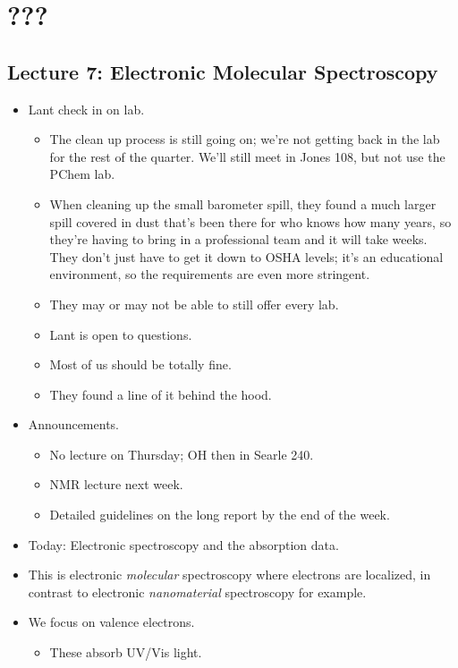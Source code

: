 \documentclass[../notes.tex]{subfiles}
\begin{document}
\chapter{???}
\section{Lecture 7: Electronic Molecular Spectroscopy}
\begin{itemize}
    \item {}Lant check in on lab.
    \begin{itemize}
        \item The clean up process is still going on; we're not getting back in the lab for the rest of the quarter. We'll still meet in Jones 108, but not use the PChem lab.
        \item When cleaning up the small barometer spill, they found a much larger spill covered in dust that's been there for who knows how many years, so they're having to bring in a professional team and it will take weeks. They don't just have to get it down to OSHA levels; it's an educational environment, so the requirements are even more stringent.
        \item They may or may not be able to still offer every lab.
        \item Lant is open to questions.
        \item Most of us should be totally fine.
        \item They found a line of it behind the hood.
    \end{itemize}
    \item Announcements.
    \begin{itemize}
        \item No lecture on Thursday; OH then in Searle 240.
        \item NMR lecture next week.
        \item Detailed guidelines on the long report by the end of the week.
    \end{itemize}
    \item Today: Electronic spectroscopy and the  absorption data.
    \item This is electronic \emph{molecular} spectroscopy where electrons are localized, in contrast to electronic \emph{nanomaterial} spectroscopy for example.
    \item We focus on valence electrons.
    \begin{itemize}
        \item These absorb UV/Vis light.

\end{itemize}
\end{itemize}
\end{document}
